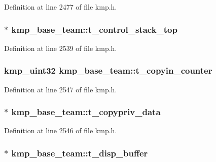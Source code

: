 Definition at line 2477 of file kmp.\-h.

\hypertarget{structkmp__base__team_a7a04d30c1ddab1dd7fd5367bc4a8d07c}{
\subsubsection[{t\-\_\-control\-\_\-stack\-\_\-top}]{$\ast$ kmp\-\_\-base\-\_\-team\-::t\-\_\-control\-\_\-stack\-\_\-top}}\label{structkmp__base__team_a7a04d30c1ddab1dd7fd5367bc4a8d07c}


Definition at line 2539 of file kmp.\-h.

\hypertarget{structkmp__base__team_a6d490508396814c7161cae6c4a58d4b0}{
\subsubsection[{t\-\_\-copyin\-\_\-counter}]{\setlength{\rightskip}{0pt plus 5cm}kmp\-\_\-uint32 kmp\-\_\-base\-\_\-team\-::t\-\_\-copyin\-\_\-counter}}\label{structkmp__base__team_a6d490508396814c7161cae6c4a58d4b0}


Definition at line 2547 of file kmp.\-h.

\hypertarget{structkmp__base__team_aa32227ecc52d1d8c3cb1ddd90ea5ae5e}{
\subsubsection[{t\-\_\-copypriv\-\_\-data}]{$\ast$ kmp\-\_\-base\-\_\-team\-::t\-\_\-copypriv\-\_\-data}}\label{structkmp__base__team_aa32227ecc52d1d8c3cb1ddd90ea5ae5e}


Definition at line 2546 of file kmp.\-h.

\hypertarget{structkmp__base__team_a6587a1837fa987f494b2f44fd059f6c6}{
\subsubsection[{t\-\_\-disp\-\_\-buffer}]{$\ast$ kmp\-\_\-base\-\_\-team\-::t\-\_\-disp\-\_\-buffer}}\label{structkmp__base__team_a6587a1837fa987f494b2f44fd059f6c6}


